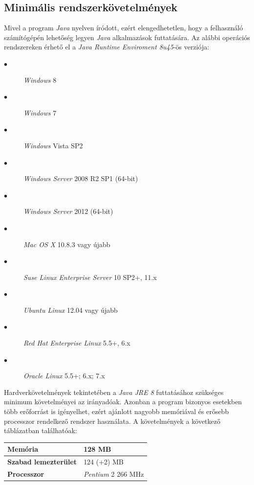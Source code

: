 \documentclass{elteikthesis}
\begin{document}
\subsection{Minimális rendszerkövetelmények}
Mivel a program \emph{Java} nyelven íródott, ezért elengedhetetlen, hogy a felhasználó számítógépén lehetőség legyen \emph{Java} alkalmazások futtatására. Az alábbi operációs rendszereken érhető el a \emph{Java Runtime Enviroment 8u45}-ös verziója:\par
\begin{description}
	\item[$\bullet$] \emph{Windows} 8
	\item[$\bullet$] \emph{Windows} 7
	\item[$\bullet$] \emph{Windows} Vista SP2
	\item[$\bullet$] \emph{Windows Server} 2008 R2 SP1 (64-bit)
	\item[$\bullet$] \emph{Windows Server} 2012 (64-bit)
	\item[$\bullet$] \emph{Mac OS X} 10.8.3 vagy újabb
	\item[$\bullet$] \emph{Suse Linux Enterprise Server} 10 SP2+, 11.x
	\item[$\bullet$] \emph{Ubuntu Linux} 12.04 vagy újabb
	\item[$\bullet$] \emph{Red Hat Enterprise Linux} 5.5+, 6.x
	\item[$\bullet$] \emph{Oracle Linux} 5.5+; 6.x; 7.x
\end{description}
\par Hardverkövetelmények tekintetében a \emph{Java JRE 8} futtatásához szükséges
minimum követelményei az irányadóak. Azonban a program bizonyos esetekben több erőforrást is igényelhet, ezért ajánlott nagyobb memóriával és erősebb processzor rendelkező rendszer használata. A követelmények a következő táblázatban találhatóak:\par
\begin{table}[h]
		\def\arraystretch{2}
		\centering
	\begin{tabular}{|l|l|}
		\hline
		\textbf{Memória}           & 128 MB            \\ \hline
		\textbf{Szabad lemezterület} & 124 (+2) MB       \\ \hline
		\textbf{Processzor}          & \emph{Pentium} 2 266 MHz \\ \hline
	\end{tabular}
\end{table}
\end{document}
